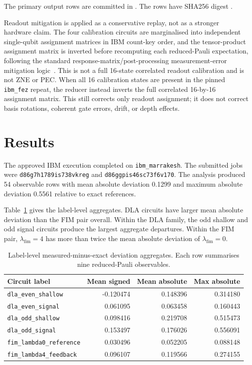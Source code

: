 \documentclass[preprint,aps,physrev,superscriptaddress,floatfix,longbibliography]{revtex4-2}
\begin{document}
The primary output rows are committed in
.
The rows have SHA256 digest
.

Readout mitigation is applied as a conservative replay, not as a stronger
hardware claim. The four calibration circuits are marginalised into independent
single-qubit assignment matrices in IBM count-key order, and the tensor-product
assignment matrix is inverted before recomputing each reduced-Pauli
expectation, following the standard response-matrix/post-processing
measurement-error mitigation logic~\cite{Maciejewski2020}. This is not a full
16-state correlated readout calibration and is not ZNE or PEC. When all 16
calibration states are present in the pinned
\texttt{ibm\_fez} repeat, the reducer instead inverts the full correlated
16-by-16 assignment matrix. This still corrects only readout assignment; it
does not correct basis rotations, coherent gate errors, drift, or depth
effects.

\section{Results}

The approved IBM execution completed on \texttt{ibm\_marrakesh}. The submitted
jobs were \texttt{d86g7h1789is738vkreg} and
\texttt{d86ggpis46sc73f6v170}. The analysis produced 54 observable rows with
mean absolute deviation 0.1299 and maximum absolute deviation 0.5561 relative
to exact references.

Table~\ref{tab:label-summary} gives the label-level aggregates. DLA circuits
have larger mean absolute deviation than the FIM pair overall. Within the DLA
family, the odd shallow and odd signal circuits produce the largest aggregate
departures. Within the FIM pair, $\lambda_{\mathrm{fim}}=4$ has more than twice
the mean absolute deviation of $\lambda_{\mathrm{fim}}=0$.

\begin{table}[tb]
\centering
\small
\begin{tabular}{lrrr}
\toprule
Circuit label & Mean signed & Mean absolute & Max absolute \\
\midrule
\texttt{dla\_even\_shallow} & -0.120474 & 0.148396 & 0.314180 \\
\texttt{dla\_even\_signal} & 0.061095 & 0.063458 & 0.160443 \\
\texttt{dla\_odd\_shallow} & 0.098416 & 0.219708 & 0.515473 \\
\texttt{dla\_odd\_signal} & 0.153497 & 0.176026 & 0.556091 \\
\texttt{fim\_lambda0\_reference} & 0.030496 & 0.052205 & 0.088148 \\
\texttt{fim\_lambda4\_feedback} & 0.096107 & 0.119566 & 0.274155 \\
\bottomrule
\end{tabular}
\caption{Label-level measured-minus-exact deviation aggregates. Each row
summarises nine reduced-Pauli observables.}
\label{tab:label-summary}
\end{table}
\end{document}
